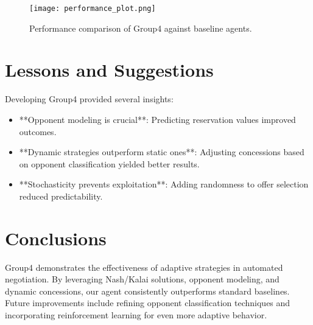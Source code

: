 \documentclass{article}
\begin{document}
\begin{figure}[h]
    \centering
    \texttt{[image: performance\_plot.png]}
    \caption{Performance comparison of Group4 against baseline agents.}
    \label{fig:performance}
\end{figure}

\section{Lessons and Suggestions}
Developing Group4 provided several insights:
\begin{itemize}
    \item **Opponent modeling is crucial**: Predicting reservation values improved outcomes.
    \item **Dynamic strategies outperform static ones**: Adjusting concessions based on opponent classification yielded better results.
    \item **Stochasticity prevents exploitation**: Adding randomness to offer selection reduced predictability.
\end{itemize}

\section*{Conclusions}
Group4 demonstrates the effectiveness of adaptive strategies in automated negotiation. By leveraging Nash/Kalai solutions, opponent modeling, and dynamic concessions, our agent consistently outperforms standard baselines. Future improvements include refining opponent classification techniques and incorporating reinforcement learning for even more adaptive behavior.
\end{document}
